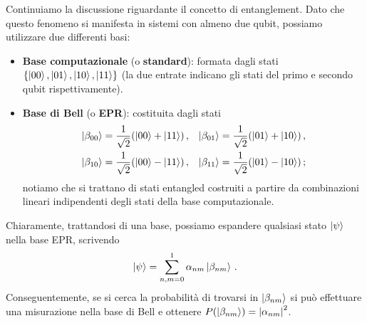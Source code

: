 \vspace{1cm}

\noindent {}

\vspace{0.5cm}

\noindent Continuiamo la discussione riguardante il concetto di entanglement. Dato che questo fenomeno si manifesta in sistemi con almeno due qubit, possiamo utilizzare due differenti basi:
\begin{itemize}
    \item \textbf{Base computazionale} (o \textbf{standard}): formata dagli stati $\lbrace \ket{00}, \ket{01}, \ket{10}, \ket{11} \rbrace$ (la due entrate indicano gli stati del primo e secondo qubit rispettivamente).
    
    \item \textbf{Base di Bell} (o \textbf{EPR}): costituita dagli stati 
    \begin{align*}
        \ket{\beta_{00}} &= \frac{1}{\sqrt{2}} (\ket{00} + \ket{11}) \, , &\ket{\beta_{01}} &= \frac{1}{\sqrt{2}} (\ket{01} + \ket{10}) \, , \\
        \ket{\beta_{10}} &= \frac{1}{\sqrt{2}} (\ket{00} - \ket{11}) \, , &\ket{\beta_{11}} &= \frac{1}{\sqrt{2}} (\ket{01} - \ket{10}) \, ;
    \end{align*}
    notiamo che si trattano di stati entangled costruiti a partire da combinazioni lineari indipendenti degli stati della base computazionale.
\end{itemize}

\noindent Chiaramente, trattandosi di una base, possiamo espandere qualsiasi stato $\ket{\psi}$ nella base EPR, scrivendo
\begin{equation*}
    \ket{\psi} = \sum_{n,m=0}^1 \alpha_{nm} \ket{\beta_{nm}} \, .
\end{equation*}
Conseguentemente, se si cerca la probabilità di trovarsi in $\ket{\beta_{nm}}$ si può effettuare una misurazione nella base di Bell e ottenere $P(\ket{\beta_{nm}}) = \abs{\alpha_{nm}}^2$. 


